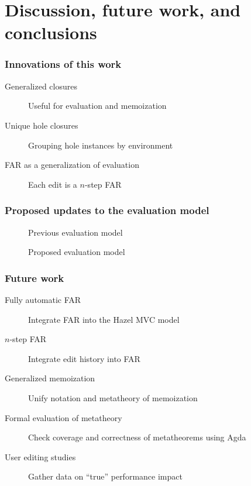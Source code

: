\documentclass{beamer}
\begin{document}
\section{Discussion, future work, and conclusions}

\begin{frame}
  \frametitle{Innovations of this work}

  \begin{description}
  \item[Generalized closures] Useful for evaluation and memoization
  \item[Unique hole closures] Grouping hole instances by environment
  \item[FAR as a generalization of evaluation] Each edit is a $n$-step FAR
  \end{description}
\end{frame}

\begin{frame}[allowframebreaks]
  \frametitle{Proposed updates to the evaluation model}

  \begin{figure}
    \centering
    \maxsizebox{\textwidth}{15em}{
      
    }
    \caption{Previous evaluation model}
    \label{fig:prev-evaluation-call-graph}
  \end{figure}

  \begin{figure}
    \centering
    \maxsizebox{\textwidth}{15em}{
      
    }
    \caption{Proposed evaluation model}
    \label{fig:current-evaluation-call-graph}
  \end{figure}
\end{frame}

\begin{frame}
  \frametitle{Future work}

  \begin{description}
  \item[Fully automatic FAR] Integrate FAR into the Hazel MVC model
  \item[$n$-step FAR] Integrate edit history into FAR
  \item[Generalized memoization] Unify notation and metatheory of memoization
  \item[Formal evaluation of metatheory] Check coverage and correctness of metatheorems using Agda
  \item[User editing studies] Gather data on ``true'' performance impact
  \end{description}
\end{frame}
\end{document}
